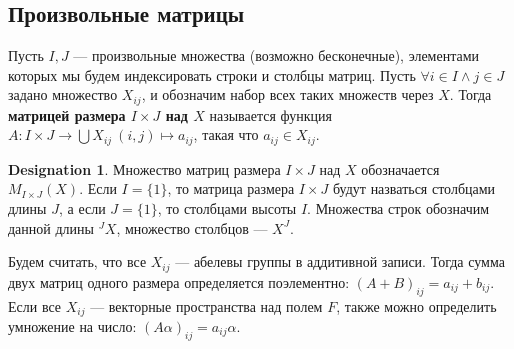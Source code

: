 \documentclass[11pt]{book}
\theoremstyle{definition}
\theoremstyle{plain}
\theoremstyle{plain}
\theoremstyle{definition}
\newtheorem*{name}{Designation}
\theoremstyle{remark}
\begin{document}
\subsection{Произвольные матрицы}
Пусть  $ I, J$ --- произвольные множества (возможно бесконечные), элементами которых мы будем индексировать строки и столбцы матриц. Пусть  $ \forall i \in I \wedge j \in J$ задано множество $ X_{ij}$, и обозначим набор всех таких множеств через $ X$. 
Тогда {\bf матрицей размера $ I \times J$ над $ X$}  называется функция  $ A: I \times J \to \bigcup X_{ij} ~ (i, j) \mapsto a_{ij}$, такая что $ a_{ij} \in X_{ij}$.
\begin{name}
Множество матриц размера $ I \times J$ над $ X$ обозначается  $ M_{I \times J}(X)$. 
Если $ I = \{1\}$, то матрица размера $ I \times J$ будут назваться столбцами длины $ J$, а если  $ J = \{1\}$, то столбцами высоты $ I$. Множества строк обозначим данной длины $ ^J\!X$, множество столбцов --- $ X^{J}$.
\end{name}
Будем считать, что все $ X_{ij}$ --- абелевы группы в аддитивной записи. Тогда сумма двух матриц одного размера определяется поэлементно: $ (A+B)_{ij} = a_{ij}+b_{ij}$.
Если все $ X_{ij}$ --- векторные пространства над полем $ F$, также можно определить умножение на число:  $ (A\alpha)_{ij} = a_{ij}\alpha$.
\end{document}
